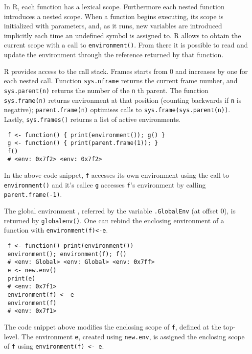 \documentclass[10pt,review,sigplan,authorversion=true]{acmart}
\newcommand{\code}[1]{\lstinline |#1|\xspace}
\renewcommand{\c}[1]{\lstinline |#1|\xspace}
\begin{document}
In R, each function has a lexical scope. Furthermore each nested function
introduces a nested scope. When a function begins executing, its scope is
initialized with parameters, and, as it runs, new variables are introduced
implicitly each time an undefined symbol is assigned to. R allows to obtain the
current scope with a call to \code{environment()}. From there it is possible to
read and update the environment through the reference returned by that function.

R provides access to the call stack. Frames starts from 0 and increases by one
for each nested call. Function \code{sys.nframe} returns the current frame
number, and \code{sys.parent(n)} returns the number of the \code{n}th parent.
The function \code{sys.frame(n)} returns environment at that position (counting
backwards if \code{n} is negative); \code{parent.frame(n)} optimises calls to
\code{sys.frame(sys.parent(n))}. Lastly, \code{sys.frames()} returns a list of
active environments.

\begin{lstlisting}
 f <- function() { print(environment()); g() }
 g <- function() { print(parent.frame(1)); }
 f()
 # <env: 0x7f2> <env: 0x7f2>
\end{lstlisting}

\noindent
In the above code snippet, \c{f} accesses its own environment using the call to
\c{environment()} and it's callee \c{g} accesses \c{f}'s environment by calling
\c{parent.frame(-1)}.

The global environment , referred by the variable \code{.GlobalEnv} (at offset
0), is returned by \code{globalenv()}. One can rebind the enclosing environment
of a function with \code{environment(f)<-e}.

\begin{lstlisting}
 f <- function() print(environment())
 environment(); environment(f); f()
 # <env: Global> <env: Global> <env: 0x7ff>
 e <- new.env()
 print(e)
 # <env: 0x7f1>
 environment(f) <- e
 environment(f)
 # <env: 0x7f1>
\end{lstlisting}

The code snippet above modifies the enclosing scope of \c{f}, defined at the
top-level. The environment \c{e}, created using \c{new.env}, is assigned the
enclosing scope of \c{f} using \c{environment(f) <- e}.
\end{document}
